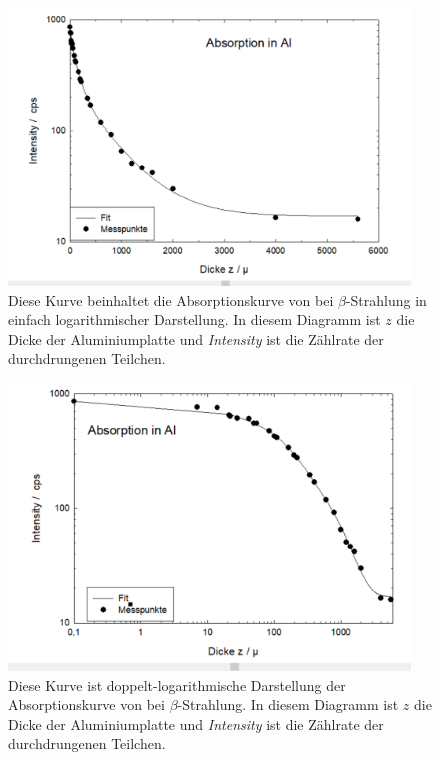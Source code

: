 \documentclass[12pt,english,ngerman]{scrartcl}
\begin{document}
\begin{figure}[H]
	\begin{center}
		\includegraphics[width = 0.95\textwidth]{figures/aluminiumabsorbtion.png}
	\end{center}
	\caption[Absorptionskurve von  bei $\beta$-Strahlung]{
		Diese Kurve beinhaltet die
		Absorptionskurve von  bei $\beta$-Strahlung in einfach logarithmischer
		Darstellung. In diesem Diagramm ist $z$ die Dicke der Aluminiumplatte und
		\emph{Intensity} ist die Zählrate der durchdrungenen Teilchen.
	}\label{fig:alu_absorption}
\end{figure}

\begin{figure}[H]
	\begin{center}
		\includegraphics[width = 0.95\textwidth]{figures/aluminiumdoppellog.png}
	\end{center}
	\caption[Doppelt-logarithmische Darstellung der Absorptionskurve von  bei
		$\beta$-Strahlung]{
		Diese Kurve ist doppelt-logarithmische Darstellung der
		Absorptionskurve von  bei $\beta$-Strahlung. In diesem Diagramm ist $z$
		die Dicke der Aluminiumplatte und \emph{Intensity} ist die Zählrate der
		durchdrungenen Teilchen.
	}\label{fig:alu_doppellog}
\end{figure}
\end{document}

